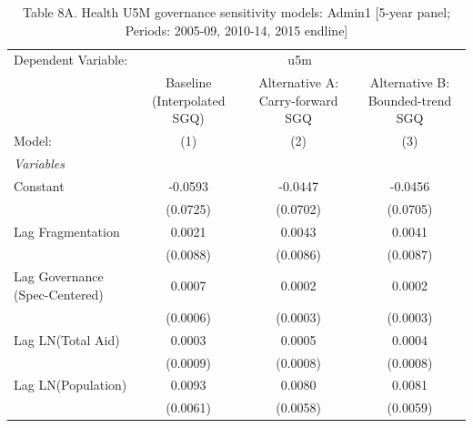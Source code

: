
\begin{table}[H]
   \caption{Table 8A. Health U5M governance sensitivity models: Admin1 [5-year panel; Periods: 2005-09, 2010-14, 2015 endline]}
   \centering
   \begin{tabular}{lccc}
      \tabularnewline \midrule \midrule
      Dependent Variable: & \multicolumn{3}{c}{u5m}\\
                                                         & Baseline (Interpolated SGQ) & Alternative A: Carry-forward SGQ & Alternative B: Bounded-trend SGQ \\   
      Model:                                             & (1)                         & (2)                              & (3)\\  
      \midrule
      \emph{Variables}\\
      Constant                                           & -0.0593                     & -0.0447                          & -0.0456\\   
                                                         & (0.0725)                    & (0.0702)                         & (0.0705)\\   
      Lag Fragmentation                                  & 0.0021                      & 0.0043                           & 0.0041\\   
                                                         & (0.0088)                    & (0.0086)                         & (0.0087)\\   
      Lag Governance (Spec-Centered)                     & 0.0007                      & 0.0002                           & 0.0002\\   
                                                         & (0.0006)                    & (0.0003)                         & (0.0003)\\   
      Lag LN(Total Aid)                                  & 0.0003                      & 0.0005                           & 0.0004\\   
                                                         & (0.0009)                    & (0.0008)                         & (0.0008)\\   
      Lag LN(Population)                                 & 0.0093                      & 0.0080                           & 0.0081\\   
                                                         & (0.0061)                    & (0.0058)                         & (0.0059)\\   

\end{tabular}
\end{table}
